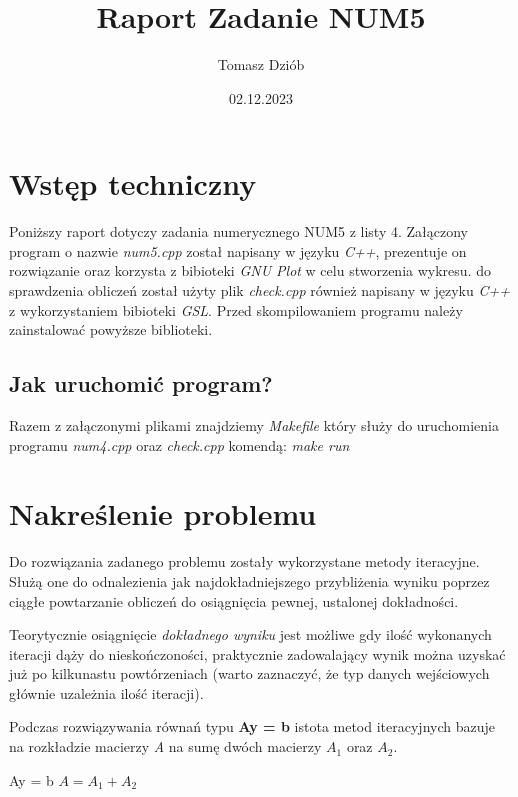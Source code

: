 \documentclass{article}
\title{Raport Zadanie NUM5}
\date{02.12.2023}
\author{Tomasz Dziób}
\begin{document}
  \maketitle
  \newpage
  \section{Wstęp techniczny}
  Poniższy raport dotyczy zadania numerycznego NUM5 z listy 4. Załączony program o nazwie \textit{num5.cpp} został napisany w języku \textit{C++}, prezentuje on rozwiązanie oraz korzysta z bibioteki \textit{GNU Plot} w celu stworzenia wykresu. do sprawdzenia obliczeń został użyty plik \textit{check.cpp} również napisany w języku \textit{C++} z wykorzystaniem bibioteki \textit{GSL}. Przed skompilowaniem programu należy zainstalować powyższe biblioteki.

    \subsection{Jak uruchomić program?}
    Razem z załączonymi plikami znajdziemy \textit{Makefile} który służy do uruchomienia programu \textit{num4.cpp} oraz \textit{check.cpp} komendą: \textit{make run}\\

  \section{Nakreślenie problemu}
  Do rozwiązania zadanego problemu zostały wykorzystane metody iteracyjne. Służą one do odnalezienia jak najdokładniejszego przybliżenia wyniku poprzez ciągłe powtarzanie obliczeń do osiągnięcia pewnej, ustalonej dokładności.
  
  Teorytycznie osiągnięcie \textit{dokładnego wyniku} jest możliwe gdy ilość wykonanych iteracji dąży do nieskończoności, praktycznie zadowalający wynik można uzyskać już po kilkunastu powtórzeniach (warto zaznaczyć, że typ danych wejściowych głównie uzależnia ilość iteracji).

  
  Podczas rozwiązywania równań typu \textbf{Ay = b} istota metod iteracyjnych bazuje na rozkładzie macierzy \textit{A} na sumę dwóch macierzy \textbf{$A_1$} oraz \textbf{$A_2$}.

  \begin{center}
    \large Ay = b \qquad \qquad \qquad $A = A_1 + A_2$ \\
    \raisebox{-0.1cm}{\large  $(A_1 + A_2)x = b$} \\
    \raisebox{-0.35cm}{\large  $A_1x = b - A_2x$}
  \end{center}
\end{document}
